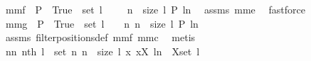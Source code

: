 \begin{isabellebody}
\isadelimproof
%
\endisadelimproof
\isanewline
{}\isamarkupfalse%
\ mm{}{}f{\isacharcolon}\ \ {\isachardoublequoteopen}P\ {\isacharminus}{\isacharbackquote}\ {\isacharbraceleft}True{\isacharbraceright}\ {\isasyminter}\ set\ l\ {\isasymnoteq}\ {\isacharbraceleft}{\isacharbraceright}{\isachardoublequoteclose}\ \ {\isachardoublequoteopen}{\isasymexists}\ n\ {\isasymin}\ {\isacharbraceleft}{}{\isachardot}{\isachardot}{\isacharless}size\ l{\isacharbraceright}{\isachardot}\ P\ {\isacharparenleft}l{\isacharbang}n{\isacharparenright}{\isachardoublequoteclose}\ \isanewline
%
\isadelimproof
%
\endisadelimproof
%
\isatagproof
{}\isamarkupfalse%
\ assms\ mm{}{}e\ \isamarkupfalse%
\ fastforce%
\endisatagproof
{\isafoldproof}%
%
\isadelimproof
\isanewline
%
\endisadelimproof
\isanewline
{}\isamarkupfalse%
\ mm{}{}g{\isacharcolon}\ \ {\isachardoublequoteopen}P\ {\isacharminus}{\isacharbackquote}\ {\isacharbraceleft}True{\isacharbraceright}\ {\isasyminter}\ set\ l\ {\isasymnoteq}\ {\isacharbraceleft}{\isacharbraceright}{\isachardoublequoteclose}\ \ {\isachardoublequoteopen}{\isacharbrackleft}n{\isachardot}\ n\ {\isasymleftarrow}\ {\isacharbrackleft}{}{\isachardot}{\isachardot}{\isacharless}size\ l{\isacharbrackright}{\isacharcomma}\ P\ {\isacharparenleft}l{\isacharbang}n{\isacharparenright}{\isacharbrackright}\ {\isasymnoteq}\ {\isacharbrackleft}{\isacharbrackright}{\isachardoublequoteclose}\ \isanewline
%
\isadelimproof
%
\endisadelimproof
%
\isatagproof
{}\isamarkupfalse%
\ assms\ filterpositions{}{\isacharunderscore}def\ mm{}{}f\ mm{}{}c\ \isamarkupfalse%
\ metis%
\endisatagproof
{\isafoldproof}%
%
\isadelimproof
\isanewline
%
\endisadelimproof
\isanewline
{}\isamarkupfalse%
\ nn{}{}{\isacharcolon}\ {\isachardoublequoteopen}{\isacharparenleft}nth\ l{\isacharparenright}\ {\isacharbackquote}\ set\ {\isacharparenleft}{\isacharbrackleft}n{\isachardot}\ n\ {\isasymleftarrow}\ {\isacharbrackleft}{}{\isachardot}{\isachardot}{\isacharless}size\ l{\isacharbrackright}{\isacharcomma}\ {\isacharparenleft}{\isacharpercent}x{\isachardot}\ x{\isasymin}X{\isacharparenright}\ {\isacharparenleft}l{\isacharbang}n{\isacharparenright}{\isacharbrackright}{\isacharparenright}\ {\isasymsubseteq}\ X{\isasyminter}set\ l{\isachardoublequoteclose}%

\end{isabellebody}
